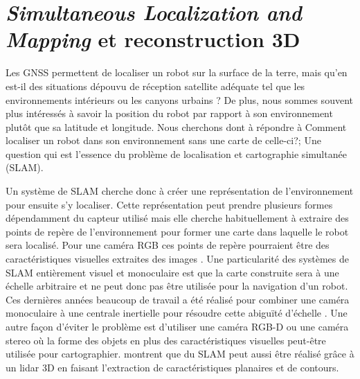 \section{\textit{Simultaneous Localization and Mapping} et reconstruction 3D}\label{subsec:reconstruction}

Les GNSS permettent de localiser un robot sur la surface de la terre, mais qu'en est-il des situations dépouvu de réception satellite adéquate tel que les environnements intérieurs ou les \guillemotleft canyons urbains \guillemotright ? De plus, nous sommes souvent plus intéressés à savoir la position du robot par rapport à son environnement plutôt que sa latitude et longitude. Nous cherchons dont à répondre à \guillemotleft Comment localiser un robot dans son environnement sans une carte de celle-ci?\guillemotright; Une question qui est l'essence du problème de localisation et cartographie simultanée (SLAM).

Un système de SLAM cherche donc à créer une représentation de l'environnement pour ensuite s'y localiser. Cette représentation peut prendre plusieurs formes dépendamment du capteur utilisé mais elle cherche habituellement à extraire des points de repère de l'environnement pour former une carte dans laquelle le robot sera localisé. Pour une caméra RGB ces points de repère pourraient être des caractéristiques visuelles extraites des images \citep{Mur-Artal2017}. Une particularité des systèmes de SLAM entièrement visuel et monoculaire est que la carte construite sera à une échelle arbitraire et ne peut donc pas être utilisée pour la navigation d'un robot. Ces dernières années beaucoup de travail a été réalisé pour combiner une caméra monoculaire à une centrale inertielle pour résoudre cette abiguïté d'échelle \citep{muratal2017vimonoslam}. Une autre façon d'éviter le problème est d'utiliser une caméra RGB-D ou une caméra stereo où la forme des objets en plus des caractéristiques visuelles peut-être utilisée \citep{henry2014rgb} pour cartographier. \cite{Zhang2017} montrent que du SLAM peut aussi être réalisé grâce à un lidar 3D en faisant l'extraction de caractéristiques planaires et de contours. 

